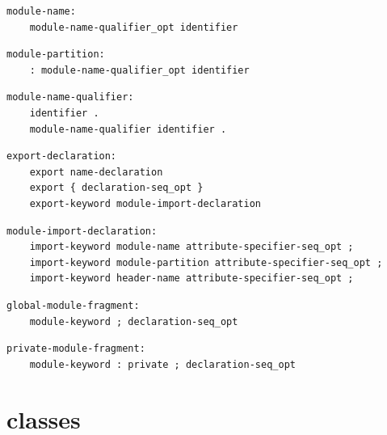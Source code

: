 \noindent\textbf{\texttt{}}\par
\begin{lstlisting}
module-name:
    module-name-qualifier_opt identifier
\end{lstlisting}

\noindent\textbf{\texttt{}}\par
\begin{lstlisting}
module-partition:
    : module-name-qualifier_opt identifier
\end{lstlisting}

\noindent\textbf{\texttt{}}\par
\begin{lstlisting}
module-name-qualifier:
    identifier .
    module-name-qualifier identifier .
\end{lstlisting}

\noindent\textbf{\texttt{}}\par
\begin{lstlisting}
export-declaration:
    export name-declaration
    export { declaration-seq_opt }
    export-keyword module-import-declaration
\end{lstlisting}

\noindent\textbf{\texttt{}}\par
\begin{lstlisting}
module-import-declaration:
    import-keyword module-name attribute-specifier-seq_opt ;
    import-keyword module-partition attribute-specifier-seq_opt ;
    import-keyword header-name attribute-specifier-seq_opt ;
\end{lstlisting}

\noindent\textbf{\texttt{}}\par
\begin{lstlisting}
global-module-fragment:
    module-keyword ; declaration-seq_opt
\end{lstlisting}

\noindent\textbf{\texttt{}}\par
\begin{lstlisting}
private-module-fragment:
    module-keyword : private ; declaration-seq_opt
\end{lstlisting}

\section{classes}

